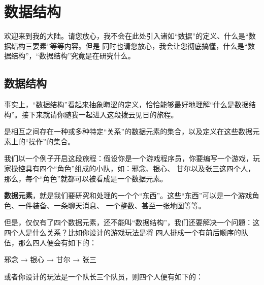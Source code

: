\chapter{数据结构}
欢迎来到我的大陆。请您放心，我不会在此处引入诸如“数据”的定义、什么是“数据结构三要素”等等内容。但是
同时也请您放心，我会让您彻底搞懂，什么是“数据结构”，“数据结构”究竟是在研究什么。%

\section{数据结构}
\label{sec:数据结构}
事实上，“数据结构”看起来抽象晦涩的定义，恰恰能够最好地理解“什么是数据结构”。接下来就请你随我一起进入这段拨云见日的旅程。
\begin{definitionbox}
    是相互之间存在一种或多种特定“关系”的数据元素的集合，以及定义在这些数据元素上的“操作”的集合。
\end{definitionbox}
我们以一个例子开启这段旅程：假设你是一个游戏程序员，你要编写一个游戏，玩家操控具有四个“角色”组成的小队，如：邪念、银心、
甘尔以及张三这四个人，那么，每个“角色”就都可以被看成是一个数据元素。
\begin{intuitionbox}
\textbf{数据元素}，就是我们要研究和处理的一个个“东西”。这些“东西”可以是一个游戏角色、一件装备、一条聊天消息、
一个整数、甚至一张地图等等。
\end{intuitionbox}
但是，仅仅有了四个数据元素，还不能叫“数据结构”，我们还要解决一个问题：这四个人是什么关系？比如你设计的游戏玩法是将
四人排成一个有前后顺序的队伍，那么四人便会有如下的：
\begin{bulk}
\begin{center}
邪念 → 银心 → 甘尔 → 张三
\end{center}
\end{bulk}
或者你设计的玩法是一个队长三个队员，则四个人便有如下的：
\begin{bulk}
\begin{center}
\end{center}
\end{bulk}
